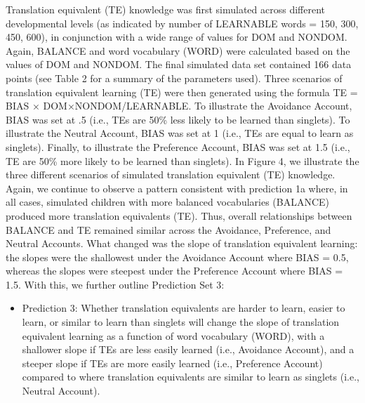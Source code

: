 \documentclass[
  english,
  ,man,floatsintext]{apa6}
\providecommand{\tightlist}{%
  \setlength{\itemsep}{0pt}\setlength{\parskip}{0pt}}
\begin{document}
Translation equivalent (TE) knowledge was first simulated across different developmental levels (as indicated by number of LEARNABLE words = 150, 300, 450, 600), in conjunction with a wide range of values for DOM and NONDOM. Again, BALANCE and word vocabulary (WORD) were calculated based on the values of DOM and NONDOM. The final simulated data set contained 166 data points (see Table 2 for a summary of the parameters used). Three scenarios of translation equivalent learning (TE) were then generated using the formula TE = BIAS × DOM×NONDOM/LEARNABLE. To illustrate the Avoidance Account, BIAS was set at .5 (i.e., TEs are 50\% less likely to be learned than singlets). To illustrate the Neutral Account, BIAS was set at 1 (i.e., TEs are equal to learn as singlets). Finally, to illustrate the Preference Account, BIAS was set at 1.5 (i.e., TE are 50\% more likely to be learned than singlets). In Figure 4, we illustrate the three different scenarios of simulated translation equivalent (TE) knowledge. Again, we continue to observe a pattern consistent with prediction 1a where, in all cases, simulated children with more balanced vocabularies (BALANCE) produced more translation equivalents (TE). Thus, overall relationships between BALANCE and TE remained similar across the Avoidance, Preference, and Neutral Accounts. What changed was the slope of translation equivalent learning: the slopes were the shallowest under the Avoidance Account where BIAS = 0.5, whereas the slopes were steepest under the Preference Account where BIAS = 1.5. With this, we further outline Prediction Set 3:

\begin{itemize}
\tightlist
\item
  Prediction 3: Whether translation equivalents are harder to learn, easier to learn, or similar to learn than singlets will change the slope of translation equivalent learning as a function of word vocabulary (WORD), with a shallower slope if TEs are less easily learned (i.e., Avoidance Account), and a steeper slope if TEs are more easily learned (i.e., Preference Account) compared to where translation equivalents are similar to learn as singlets (i.e., Neutral Account).
\end{itemize}
\end{document}
